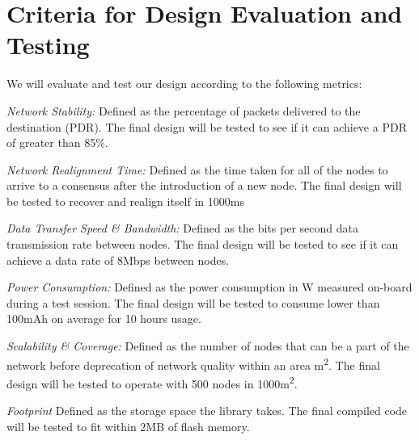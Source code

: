 \section{Criteria for Design Evaluation and Testing}
We will evaluate and test our design according to the following metrics:

\textit{Network Stability:}
Defined as the percentage of packets delivered to the destination (PDR). The final design will be tested to see if it can achieve a PDR of greater than 85\%.

\textit{Network Realignment Time:}
Defined as the time taken for all of the nodes to arrive to a consensus after the introduction of a new node. The final design will be tested to recover and realign itself in 1000\si{ms}

\textit{Data Transfer Speed \& Bandwidth:}
Defined as the bits per second data transmission rate between nodes. The final design will be tested to see if it can achieve a data rate of 8\si{Mbps} between nodes.

\textit{Power Consumption:}
Defined as the power consumption in \si{W} measured on-board during a test session. The final design will be tested to consume lower than 100\si{mAh} on average for 10 hours usage.

\textit{Scalability \& Coverage:}
Defined as the number of nodes that can be a part of the network before deprecation of network quality within an area \si{m^2}. The final design will be tested to operate with 500 nodes in 1000\si{m^2}.

\textit{Footprint}
Defined as the storage space the library takes. The final compiled code will be tested to fit within 2\si{MB} of flash memory.